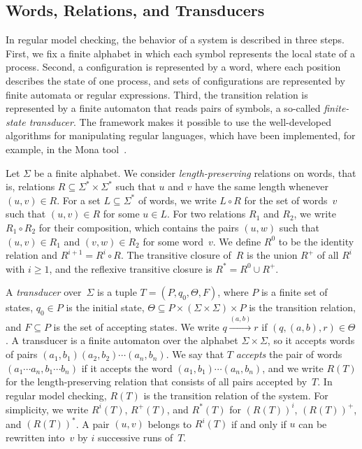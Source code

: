 \subsection{Words, Relations, and Transducers}

In regular model checking, the behavior of a system is described in three
steps. First, we fix a finite alphabet in which each symbol represents the
local state of a process. Second, a configuration is represented by a word,
where each position describes the state of one process, and sets of
configurations are represented by finite automata or regular expressions.
Third, the transition relation is represented by a finite automaton that reads
pairs of symbols, a so-called \emph{finite-state transducer}. The framework
makes it possible to use the well-developed algorithms for manipulating
regular languages, which have been implemented, for example, in the Mona
tool~\cite{Mona95}.

Let $\Sigma$ be a finite alphabet. We consider \emph{length-preserving}
relations on words, that is, relations $R \subseteq \Sigma^* \times \Sigma^*$
such that $u$ and $v$ have the same length whenever $(u,v) \in R$. For a set
$L \subseteq \Sigma^*$ of words, we write $L \circ R$ for the set of words~$v$
such that $(u,v) \in R$ for some $u \in L$. For two relations $R_1$ and
$R_2$, we write $R_1 \circ R_2$ for their composition, which contains the
pairs $(u,w)$ such that $(u,v) \in R_1$ and $(v,w) \in R_2$ for some word~$v$.
We define $R^0$ to be the identity relation and $R^{i+1} = R^i \circ R$. The
transitive closure of~$R$ is the union $R^+$ of all $R^i$ with $i \geq 1$, and
the reflexive transitive closure is $R^* = R^0 \cup R^+$.

A \emph{transducer} over~$\Sigma$ is a tuple $T = (P, q_0, \Theta, F)$, where
$P$ is a finite set of states, $q_0 \in P$ is the initial state, $\Theta
\subseteq P \times (\Sigma \times \Sigma) \times P$ is the transition
relation, and $F \subseteq P$ is the set of accepting states. We write $q
\xrightarrow{(a,b)} r$ if $(q,(a,b),r) \in \Theta$. A transducer is a finite
automaton over the alphabet $\Sigma \times \Sigma$, so it accepts words of
pairs $(a_1,b_1)(a_2,b_2) \cdots (a_n,b_n)$. We say that $T$ \emph{accepts}
the pair of words $(a_1 \cdots a_n, b_1 \cdots b_n)$ if it accepts the word
$(a_1,b_1) \cdots (a_n,b_n)$, and we write $R(T)$ for the length-preserving
relation that consists of all pairs accepted by~$T$. In regular model
checking, $R(T)$ is the transition relation of the system. For simplicity, we
write $R^i(T)$, $R^+(T)$, and $R^*(T)$ for $(R(T))^i$, $(R(T))^+$, and
$(R(T))^*$. A pair $(u,v)$ belongs to $R^i(T)$ if and only if $u$ can be rewritten
into~$v$ by $i$ successive runs of~$T$.

